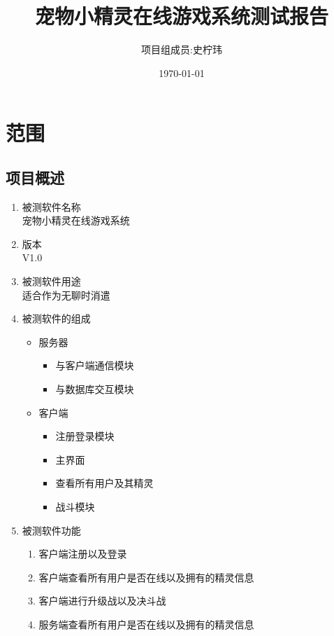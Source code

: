 \documentclass{article}
\begin{document}
\title{宠物小精灵在线游戏系统测试报告}
\author{项目组成员:史柠玮}
\date{\today}


\maketitle
\pagebreak[4]
\tableofcontents
\pagebreak[4]


\section{范围}

\subsection{项目概述}
\begin{enumerate}
\item 被测软件名称\\
  宠物小精灵在线游戏系统
\item 版本\\V1.0
\item 被测软件用途\\
  适合作为无聊时消遣
\item 被测软件的组成
  \begin{itemize}
  \item 服务器
    \begin{itemize}
    \item 与客户端通信模块
    \item 与数据库交互模块
    \end{itemize}
  \item 客户端
    \begin{itemize}
    \item 注册登录模块
    \item 主界面
    \item 查看所有用户及其精灵
    \item 战斗模块
    \end{itemize}
  \end{itemize}
\item 被测软件功能
  \begin{enumerate}
  \item 客户端注册以及登录
  \item 客户端查看所有用户是否在线以及拥有的精灵信息
  \item 客户端进行升级战以及决斗战
  \item 服务端查看所有用户是否在线以及拥有的精灵信息
  \end{enumerate}
\end{enumerate}
\end{document}
